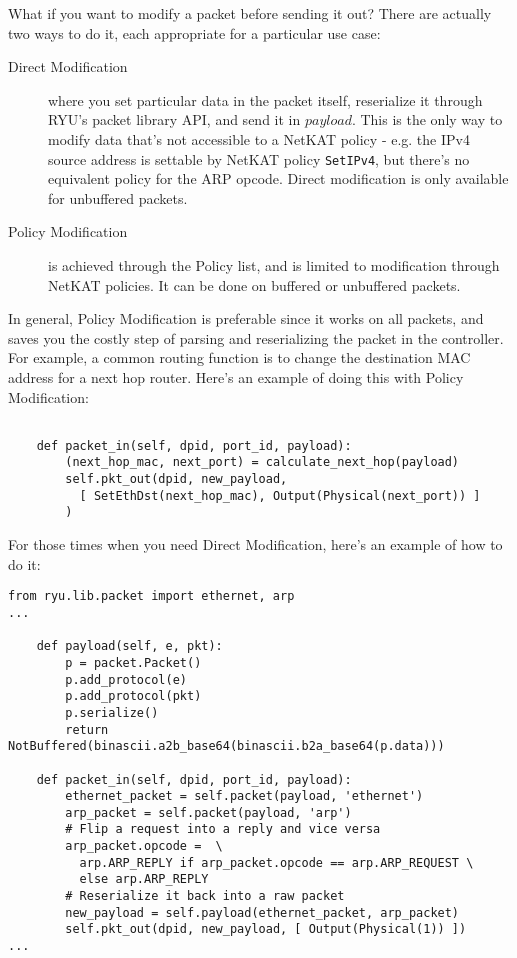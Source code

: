 What if you want to modify a packet before sending it out?  
There are actually two ways to do it, each appropriate for a particular use case:

\begin{description}
  \item[Direct Modification] where you set particular data in the packet itself, reserialize it through RYU's packet
  library API, and send it in $payload$.  
  This is the only way to modify data that's not accessible to a NetKAT policy - e.g. the IPv4 source address is
  settable by NetKAT policy \texttt{SetIPv4}, but there's no equivalent policy for the ARP opcode.  
  Direct modification is only available for unbuffered packets.
  \item[Policy Modification] is achieved through the Policy list, and is limited to modification through NetKAT
  policies.
  It can be done on buffered or unbuffered packets.
\end{description}

In general, Policy Modification is preferable since it works on all packets, and saves you the costly step of parsing and 
reserializing the packet in the controller.
For example, a common routing function is to change the destination MAC address for a next hop router.
Here's an example of doing this with Policy Modification:

\begin{verbatim}

    def packet_in(self, dpid, port_id, payload):
        (next_hop_mac, next_port) = calculate_next_hop(payload)
        self.pkt_out(dpid, new_payload, 
          [ SetEthDst(next_hop_mac), Output(Physical(next_port)) ]
        )	

\end{verbatim}

For those times when you need Direct Modification, here's an example of how to do it:

\begin{verbatim}
from ryu.lib.packet import ethernet, arp
...

    def payload(self, e, pkt):
        p = packet.Packet()
        p.add_protocol(e)
        p.add_protocol(pkt)
        p.serialize()
        return NotBuffered(binascii.a2b_base64(binascii.b2a_base64(p.data)))

    def packet_in(self, dpid, port_id, payload):
        ethernet_packet = self.packet(payload, 'ethernet') 
        arp_packet = self.packet(payload, 'arp')
        # Flip a request into a reply and vice versa
        arp_packet.opcode =  \ 
          arp.ARP_REPLY if arp_packet.opcode == arp.ARP_REQUEST \
          else arp.ARP_REPLY
	    # Reserialize it back into a raw packet
        new_payload = self.payload(ethernet_packet, arp_packet)
        self.pkt_out(dpid, new_payload, [ Output(Physical(1)) ])	
...
\end{verbatim}

